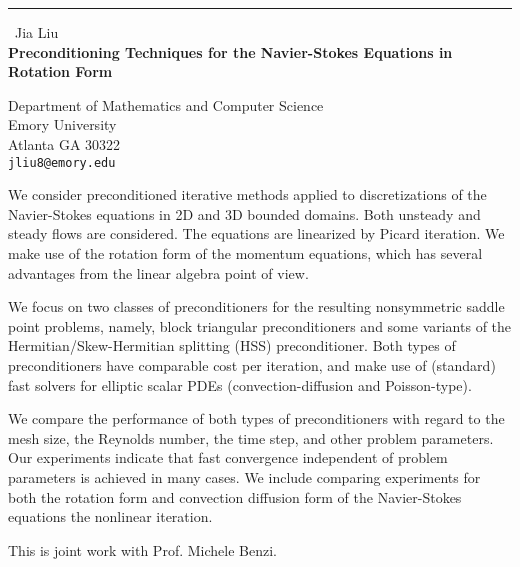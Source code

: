 \documentclass{report}
\begin{document}
\begin{center}
\rule{6in}{1pt} \
{\large Jia Liu \\
{\bf Preconditioning Techniques for the Navier-Stokes Equations in Rotation Form}}

Department of Mathematics and Computer Science \\ Emory University \\ Atlanta GA 30322
\\
{\tt jliu8@emory.edu}\end{center}



We consider preconditioned iterative methods applied to
discretizations of the Navier-Stokes equations in 2D and 3D bounded
domains. Both unsteady and steady flows are considered. The
equations are linearized by Picard iteration. We make use of the
rotation form of the momentum equations, which has several
advantages from the linear algebra point of view.


We focus on two classes of preconditioners for the resulting
nonsymmetric saddle point problems, namely, block triangular
preconditioners and some variants of the Hermitian/Skew-Hermitian
splitting (HSS) preconditioner. Both types of preconditioners have
comparable cost per iteration, and make use of (standard) fast
solvers for elliptic scalar PDEs (convection-diffusion and
Poisson-type).


We compare the performance of both types of preconditioners with
regard to the mesh size, the Reynolds number, the time step, and
other problem parameters. Our experiments indicate that fast
convergence independent of problem parameters is achieved in many
cases. We include comparing experiments for both the rotation form
and convection diffusion form of the Navier-Stokes equations the
nonlinear iteration.


This is joint work with Prof. Michele Benzi.
\end{document}
